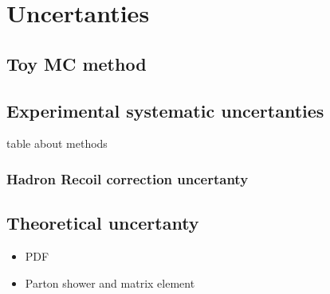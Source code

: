 \chapter{Uncertanties}
\section{Toy MC method}
\section{Experimental systematic uncertanties}
table about methods
\subsection{Hadron Recoil correction uncertanty}
\section{Theoretical uncertanty}
\begin{itemize}
\item PDF 
\item Parton shower and matrix element
\end{itemize}
